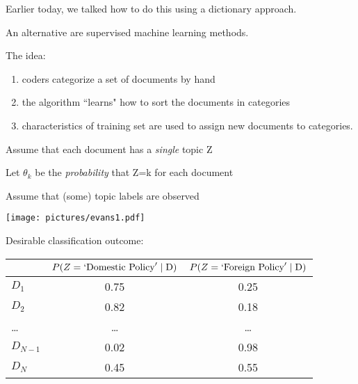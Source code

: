 \documentclass[kp]{foilpack}
\begin{document}
Earlier today, we talked how to do this using a dictionary approach.

An alternative are supervised machine learning methods.

The idea: 

\begin{enumerate}

\item coders categorize a set of documents by hand
\item the algorithm ``learns" how to sort the documents in categories
\item  characteristics of training set are used  to assign new documents to categories.
\end{enumerate}



Assume that each document has a \textit{single} topic Z

Let $\theta_k$ be the \textit{probability} that Z=k for each document

Assume that (some) topic labels are observed







\centerline{\texttt{[image: pictures/evans1.pdf]}}


Desirable classification outcome:

\begin{center}
\begin{tabular}{lcc}
      & $P(Z=`\text{Domestic Policy}'\mid \text D)$ & $P(Z=`\text{Foreign Policy}' \mid \text D)$ \\ \toprule
$D_1$ & 0.75 & 0.25 \\
$D_2$ & 0.82 & 0.18 \\
\ldots & \ldots & \ldots\\
$D_{N-1}$ & 0.02 & 0.98 \\
$D_N$ & 0.45 & 0.55\\ \bottomrule
\end{tabular}
\end{center}
\end{document}
